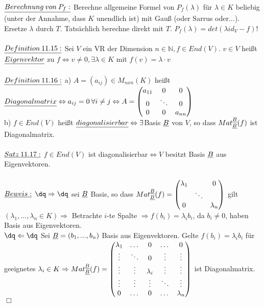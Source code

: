 \documentclass[fleqn, a4paper, 11pt]{scrartcl}
\newcommand{\NN}{\mathbb{N}}
\theoremstyle{definition}
\begin{document}
\\
$\uline{Berechnung\:von\:P_f:}$ Berechne allgemeine Formel von $P_f(\lambda)$ für $\lambda\in K$ beliebig (unter der Annahme, dass $K$ unendlich ist) mit Gauß (oder Sarrus oder...). Ersetze $\lambda$ durch $T$. Tatsächlich berechne direkt mit $T$. $P_f(\lambda)=det(\lambda id_V-f)!$\\
\\
$\uline{Definition\:11.15:}$ Sei $V$ ein VR der Dimension $n\in\NN,f\in End(V)$. $v\in V$ heißt $\uline{Eigenvektor}$ zu $f\Leftrightarrow v\neq 0,\exists\lambda\in K$ mit $f(v)=\lambda\cdot v$\\
\\
$\uline{Definition\:11.16:}$ a) $A=(a_{ij})\in M_{nxn}(K)$ heißt $\uline{Diagonalmatrix}\Leftrightarrow a_{ij}=0\:\forall i\neq j\Leftrightarrow A=\begin{pmatrix}
	a_{11} & 0 & 0\\
	0 & \ddots & 0\\
	0 & 0 & a_{nn}
\end{pmatrix}$\\
b) $f\in End(V)$ heißt $\uline{diagonalisierbar}\Leftrightarrow\exists$Basis $\uline{B}$ von $V$, so dass $Mat_{\uline{B}}^{\uline{B}}(f)$ ist Diagonalmatrix.\\
\\
$\uline{Satz\:11.17:}$ $f\in End(V)$ ist diagonalisierbar$\Leftrightarrow V$ besitzt Basis $\uline{B}$ aus Eigenvektoren.\\
\\
$\uline{Beweis:}$ $\dq\Rightarrow\dq$ sei $\uline{B}$ Basis, so dass $Mat_{\uline{B}}^{\uline{B}}(f)=\begin{pmatrix}
	\lambda_1 & & 0\\
	& \ddots & \\
	0 & & \lambda_n
\end{pmatrix}$ gilt $(\lambda_1,...,\lambda_n\in K)\Rightarrow$ Betrachte $i$-te Spalte $\Rightarrow f(b_i)=\lambda_i b_i$, da $b_i\neq 0$, haben Basis aus Eigenvektoren.\\
$\dq\Leftarrow\dq$ Sei $\uline{B}=(b_1,...,b_n)$ Basis aus Eigenvektoren. Gelte $f(b_i)=\lambda_i b_i$ für geeignetes $\lambda_i\in K\Rightarrow Mat_{\uline{B}}^{\uline{B}}(f)=\begin{pmatrix}
	\lambda_1 & \dots & 0 & \dots & 0\\
	\vdots & \ddots & 0 & \vdots & \vdots \\
	\vdots & \vdots & \lambda_i & \vdots & \vdots \\
	\vdots & \vdots & \vdots & \ddots & \vdots \\
	0 & \dots & 0 & \dots & \lambda_n
\end{pmatrix}$ ist Diagonalmatrix. \hfill $\Box$\\
\end{document}
